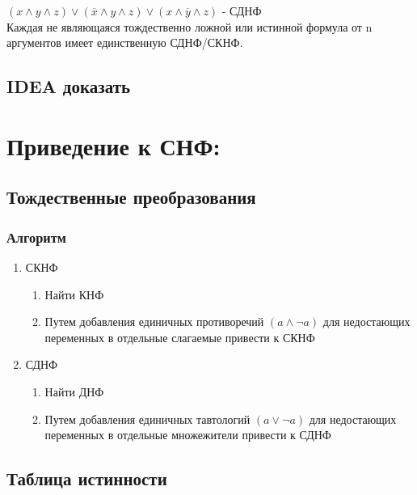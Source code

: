 \documentclass[letterpaper]{article}
\begin{document}
\((x \land y \land z) \lor (\overline{x} \land y \land z) \lor (x \land \overline{y} \land z)\) - СДНФ\\

Каждая не являющаяся тождественно ложной или истинной формула от n аргументов имеет единственную СДНФ/СКНФ.\\
\subsection{{\bfseries\sffamily IDEA} доказать}
\label{sec:orgb854f47}
\section{Приведение к СНФ:}
\label{sec:orgef2f51b}
\subsection{Тождественные преобразования}
\label{sec:org0e2e186}
\subsubsection{Алгоритм}
\label{sec:org23a081f}
\begin{enumerate}
\item СКНФ
\label{sec:orgc379bf9}
\begin{enumerate}
\item Найти КНФ\\
\item Путем добавления единичных противоречий \((a \land \neg{a})\) для недостающих переменных в отдельные слагаемые привести к СКНФ\\
\end{enumerate}
\item СДНФ
\label{sec:org326773d}
\begin{enumerate}
\item Найти ДНФ\\
\item Путем добавления единичных тавтологий \((a \lor \neg{a})\) для недостающих переменных в отдельные множежители привести к СДНФ\\
\end{enumerate}
\end{enumerate}
\subsection{Таблица истинности}
\label{sec:orgde897a5}
\end{document}
